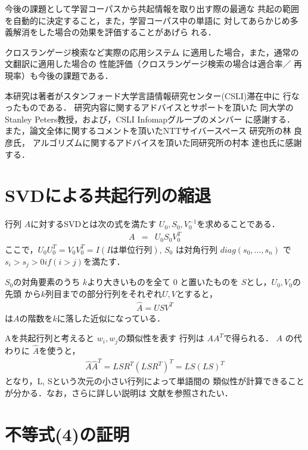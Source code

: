   今後の課題として学習コーパスから共起情報を取り出す際の最適な
共起の範囲を自動的に決定すること，また，学習コーパス中の単語に
対してあらかじめ多義解消をした場合の効果を評価することがあげら
れる．

  クロスランゲージ検索など実際の応用システム
に適用した場合，また，通常の文翻訳に適用した場合の
性能評価（クロスランゲージ検索の場合は適合率／
再現率）も今後の課題である．

\acknowledgment

 本研究は著者がスタンフォード大学言語情報研究センター(CSLI)滞在中に
 行なったものである． 研究内容に関するアドバイスとサポートを頂いた
 同大学のStanley Peters教授，および，CSLI Infomapグループのメンバー
 に感謝する．
 また，論文全体に関するコメントを頂いたNTTサイバースペース
研究所の林 良彦氏，
 アルゴリズムに関するアドバイスを頂いた同研究所の村本 
 達也氏に感謝する．



\appendix 

\section{SVDによる共起行列の縮退}

行列 $ A $に対するSVDとは次の式を満たす 
$U_{0}, S_{0}, V_0^{-1}$を求めることである．
\begin{eqnarray*}
A & = & U_0 S_0 V_0^T
\end{eqnarray*}
ここで，$U_0U_0^T = V_0V_0^T = I (I は単位行列)$, 
$ S_0 $ は対角行列 $diag(s_0, ... ,s_n) $ で 
$ s_i > s_j > 0 if (i > j) $を満たす．

$ S_0 $の対角要素のうち $ k $より大きいものを全て 
0 と置いたものを $S$とし，$U_0, V_0$の先頭
から$ k $列目までの部分行列をそれぞれ$U, V$とすると，
\begin{eqnarray*}
 \hat{A} = USV^{T} 
\end{eqnarray*}
は$ A $の階数を$k$に落した近似になっている．

Aを共起行列と考えると $w_i,w_j$の類似性を表す
行列は $ AA^{T}$で得られる．
$A$ の代わりに $\hat{A}$を使うと， 
\begin{eqnarray*}
\hat{A}\hat{A}^{T} = LSR^{T}(LSR^{T})^{T} = LS(LS)^{T} \label{aa}
\end{eqnarray*}
となり，L, Sという次元の小さい行列によって単語間の
類似性が計算できることが分かる．なお，さらに詳しい説明は
文献\cite{Deerwester90}\cite{Schuetze97}を参照されたい．

\section{不等式(4)の証明}

